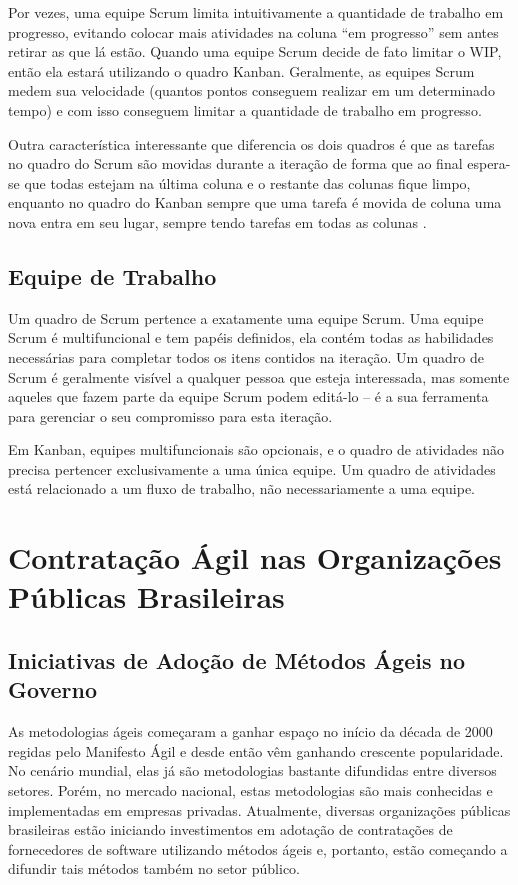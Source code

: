 Por vezes, uma equipe Scrum limita intuitivamente a quantidade de trabalho em progresso, evitando colocar mais atividades na coluna “em progresso” sem antes retirar as que lá estão. Quando uma equipe Scrum decide de fato limitar o WIP, então ela estará utilizando o quadro Kanban. Geralmente, as equipes Scrum medem sua velocidade (quantos pontos conseguem realizar em um determinado tempo) e com isso conseguem limitar a quantidade de trabalho em progresso.

Outra característica interessante que diferencia os dois quadros é que as tarefas no quadro do Scrum são movidas durante a iteração de forma que ao final espera-se que todas estejam na última coluna e o restante das colunas fique limpo, enquanto no quadro do Kanban sempre que uma tarefa é movida de coluna uma nova entra em seu lugar, sempre tendo tarefas em todas as colunas  \cite{kniberg2009}.

\subsection[Equipe de Trabalho]{Equipe de Trabalho}

Um quadro de Scrum pertence a exatamente uma equipe Scrum. Uma equipe Scrum é multifuncional e tem papéis definidos, ela contém todas as habilidades necessárias para completar todos os itens contidos na iteração. Um quadro de Scrum é geralmente visível a qualquer pessoa que esteja interessada, mas somente aqueles que fazem parte da equipe Scrum podem editá-lo – é a sua ferramenta para gerenciar o seu compromisso para esta iteração.

Em Kanban, equipes multifuncionais são opcionais, e o quadro de atividades não precisa pertencer exclusivamente a uma única equipe. Um quadro de atividades está relacionado a um fluxo de trabalho, não necessariamente a uma equipe.

\section[Contratação Ágil nas Organizações Públicas Brasileiras]{Contratação Ágil nas Organizações Públicas Brasileiras}

\subsection[Iniciativas de Adoção de Métodos Ágeis no Governo]{Iniciativas de Adoção de Métodos Ágeis no Governo}

As metodologias ágeis começaram a ganhar espaço no início da década de 2000 regidas pelo Manifesto Ágil e desde então vêm ganhando crescente popularidade. No cenário mundial, elas já são metodologias bastante difundidas entre diversos setores. Porém, no mercado nacional, estas metodologias são mais conhecidas e implementadas em empresas privadas. Atualmente, diversas organizações públicas brasileiras estão iniciando investimentos em adotação de contratações de fornecedores de software utilizando métodos ágeis e, portanto, estão começando a difundir tais métodos também no setor público.

